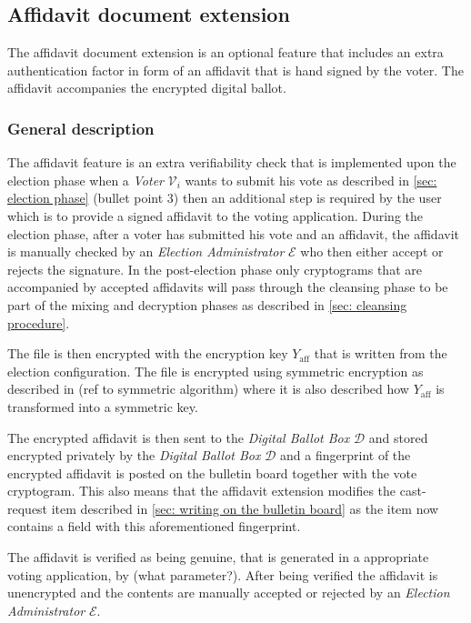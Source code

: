 \subsection{Affidavit document extension} \label{app: affidavit document extension}
The affidavit document extension is an optional feature that includes an extra authentication factor in form of an affidavit that is hand signed by the voter. The affidavit accompanies the encrypted digital ballot.


\subsubsection{General description}
The affidavit feature is an extra verifiability check that is implemented upon the election phase when a \textit{Voter} $\mathcal{V}_i$ wants to submit his vote as described in \cref{sec: election phase} (bullet point 3) then an additional step is required by the user which is to provide a signed affidavit to the voting application. During the election phase, after a voter has submitted his vote and an affidavit, the affidavit is manually checked by an \textit{Election Administrator} $\mathcal{E}$ who then either accept or rejects the signature. In the post-election phase only cryptograms that are accompanied by accepted affidavits will pass through the cleansing phase to be part of the mixing and decryption phases as described in \cref{sec: cleansing procedure}.

The file is then encrypted with the encryption key $Y_\mathrm{aff}$ that is written from the election configuration. The file is encrypted using symmetric encryption as described in (ref to symmetric algorithm) where it is also described how $Y_\mathrm{aff}$ is transformed into a symmetric key.

The encrypted affidavit is then sent to the \textit{Digital Ballot Box} $\mathcal{D}$ and stored encrypted privately by the \textit{Digital Ballot Box} $\mathcal{D}$ and a fingerprint of the encrypted affidavit is posted on the bulletin board together with the vote cryptogram. This also means that the affidavit extension modifies the cast-request item described in \cref{sec: writing on the bulletin board} as the item now contains a field with this aforementioned fingerprint.


The affidavit is verified as being genuine, that is generated in a appropriate voting application, by (what parameter?). After being verified the affidavit is unencrypted and the contents are manually accepted or rejected by an \textit{Election Administrator} $\mathcal{E}$.

